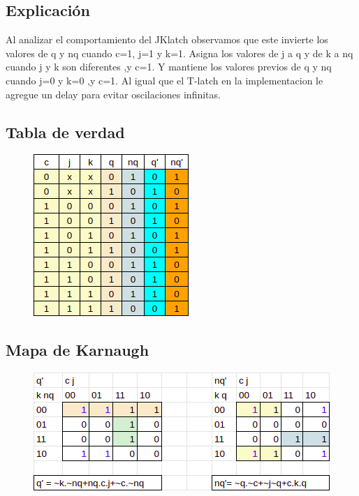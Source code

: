 \subsection*{Explicación}
Al analizar el comportamiento del JKlatch observamos que este invierte los valores de q y nq cuando c=1, j=1 y k=1. Asigna los valores de j a q y de k a nq cuando j y k son diferentes ,y c=1. Y mantiene los valores previos de q y nq cuando j=0 y k=0 ,y c=1. Al igual que el T-latch en la implementacion le agregue un delay para evitar oscilaciones infinitas.

\subsection*{Tabla de verdad}
\begin{figure}[h]
    \centering
    \includegraphics{fotos/TruthTable/arki-lab2-TT_jklatch.png}
\end{figure}
\subsection*{Mapa de Karnaugh}
\begin{figure}[h]
    \centering
    \includegraphics{fotos/kmaps/arki-lab2-kmap_jklatch.png}
\end{figure}

